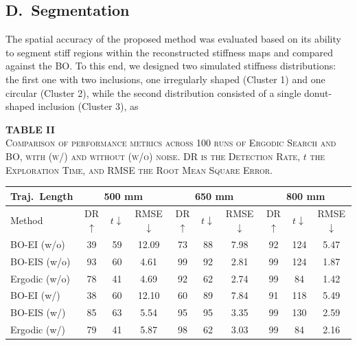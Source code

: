 \documentclass[11pt]{article}
\begin{document}
\subsection*{D.\ Segmentation}

The spatial accuracy of the proposed method was evaluated based on
its ability to segment stiff regions within the reconstructed
stiffness maps and compared against the BO. To this end, we designed
two simulated stiffness distributions: the first one with two
inclusions, one irregularly shaped (Cluster 1) and one circular
(Cluster 2), while the second distribution consisted of a single
donut-shaped inclusion (Cluster 3), as

\newpage

\setcounter{equation}{5}

\begin{center}
\textbf{TABLE II}\\[2pt]
\textsc{Comparison of performance metrics across 100 runs of Ergodic
Search and BO, with (w/) and without (w/o) noise. DR is the Detection
Rate, $t$ the Exploration Time, and RMSE the Root Mean Square Error.}
\end{center}

\begin{center}
\footnotesize
\begin{tabular}{|l|ccc|ccc|ccc|}
\hline
Traj.\ Length
  & \multicolumn{3}{c|}{500 mm}
  & \multicolumn{3}{c|}{650 mm}
  & \multicolumn{3}{c|}{800 mm} \\
\hline
Method & DR $\uparrow$ & $t\downarrow$ & RMSE$\downarrow$
       & DR $\uparrow$ & $t\downarrow$ & RMSE$\downarrow$
       & DR $\uparrow$ & $t\downarrow$ & RMSE$\downarrow$ \\
\hline
BO-EI (w/o)   & 39 & 59 & 12.09 & 73 & 88 & 7.98 & 92 & 124 & 5.47 \\
BO-EIS (w/o)  & 93 & 60 &  4.61 & 99 & 92 & 2.81 & 99 & 124 & 1.87 \\
Ergodic (w/o) & 78 & 41 &  4.69 & 92 & 62 & 2.74 & 99 &  84 & 1.42 \\
BO-EI (w/)    & 38 & 60 & 12.10 & 60 & 89 & 7.84 & 91 & 118 & 5.49 \\
BO-EIS (w/)   & 85 & 63 &  5.54 & 95 & 95 & 3.35 & 99 & 130 & 2.59 \\
Ergodic (w/)  & 79 & 41 &  5.87 & 98 & 62 & 3.03 & 99 &  84 & 2.16 \\
\hline
\end{tabular}
\end{center}
\end{document}

